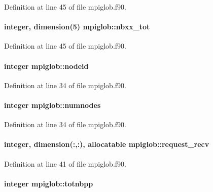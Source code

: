 Definition at line 45 of file mpiglob.\-f90.

\hypertarget{classmpiglob_a9464db6473bd65e409a14dba4d316e14}{
\paragraph[{nbxx\-\_\-tot}]{\setlength{\rightskip}{0pt plus 5cm}integer, dimension(5) mpiglob\-::nbxx\-\_\-tot}}\label{classmpiglob_a9464db6473bd65e409a14dba4d316e14}


Definition at line 45 of file mpiglob.\-f90.

\hypertarget{classmpiglob_aafd77c973e66035b1e44b11b715dd7d2}{
\paragraph[{nodeid}]{\setlength{\rightskip}{0pt plus 5cm}integer mpiglob\-::nodeid}}\label{classmpiglob_aafd77c973e66035b1e44b11b715dd7d2}


Definition at line 34 of file mpiglob.\-f90.

\hypertarget{classmpiglob_a464a7de45a158a58a5fa1a42f409bc22}{
\paragraph[{numnodes}]{\setlength{\rightskip}{0pt plus 5cm}integer mpiglob\-::numnodes}}\label{classmpiglob_a464a7de45a158a58a5fa1a42f409bc22}


Definition at line 34 of file mpiglob.\-f90.

\hypertarget{classmpiglob_ad79036e2e9749dc0366d88be2733bd4d}{
\paragraph[{request\-\_\-recv}]{\setlength{\rightskip}{0pt plus 5cm}integer, dimension(\-:,\-:), allocatable mpiglob\-::request\-\_\-recv}}\label{classmpiglob_ad79036e2e9749dc0366d88be2733bd4d}


Definition at line 41 of file mpiglob.\-f90.

\hypertarget{classmpiglob_acb24c7c7e56cdaa3d4d13bf504a45301}{
\paragraph[{totnbpp}]{\setlength{\rightskip}{0pt plus 5cm}integer mpiglob\-::totnbpp}}\label{classmpiglob_acb24c7c7e56cdaa3d4d13bf504a45301}


